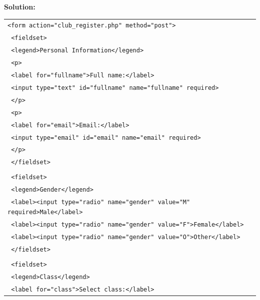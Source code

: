 \documentclass[11pt]{article}
\begin{document}
\begin{exoresolu}
\tcblower
\textbf{Solution:}
\begin{tabular}{@{}l@{}}
\texttt{\textless form action="club\_register.php" method="post"\textgreater} \\
\texttt{  \textless fieldset\textgreater} \\
\texttt{    \textless legend\textgreater Personal Information\textless/legend\textgreater} \\
\texttt{    \textless p\textgreater} \\
\texttt{      \textless label for="fullname"\textgreater Full name:\textless/label\textgreater} \\
\texttt{      \textless input type="text" id="fullname" name="fullname" required\textgreater} \\
\texttt{    \textless/p\textgreater} \\
\texttt{    \textless p\textgreater} \\
\texttt{      \textless label for="email"\textgreater Email:\textless/label\textgreater} \\
\texttt{      \textless input type="email" id="email" name="email" required\textgreater} \\
\texttt{    \textless/p\textgreater} \\
\texttt{  \textless/fieldset\textgreater} \\
\texttt{} \\
\texttt{  \textless fieldset\textgreater} \\
\texttt{    \textless legend\textgreater Gender\textless/legend\textgreater} \\
\texttt{    \textless label\textgreater\textless input type="radio" name="gender" value="M" required\textgreater Male\textless/label\textgreater} \\
\texttt{    \textless label\textgreater\textless input type="radio" name="gender" value="F"\textgreater Female\textless/label\textgreater} \\
\texttt{    \textless label\textgreater\textless input type="radio" name="gender" value="O"\textgreater Other\textless/label\textgreater} \\
\texttt{  \textless/fieldset\textgreater} \\
\texttt{} \\
\texttt{  \textless fieldset\textgreater} \\
\texttt{    \textless legend\textgreater Class\textless/legend\textgreater} \\
\texttt{    \textless label for="class"\textgreater Select class:\textless/label\textgreater} \\

\end{tabular}
\end{exoresolu}
\end{document}

